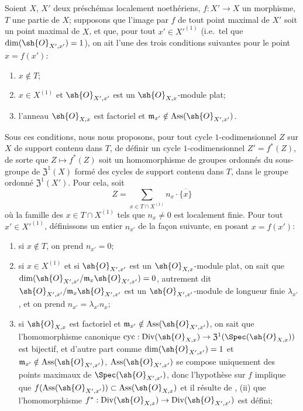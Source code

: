 \begin{env}[21.10.1]
\label{IV.21.10.1}
Soient $X$, $X'$ deux préschémas localement noethériens, $f:X'\to X$ un morphisme, $T$ une partie de $X$;
supposons que l'image par $f$ de tout point maximal de $X'$ soit un point maximal de $X$, et que, pour tout $x'\in X'^{(1)}$ (i.e.\ tel que $\dim(\sh{O}_{X',x'})=1$), on ait l'une des trois conditions suivantes pour le point $x=f(x')$:
\begin{enumerate}[label=(\roman*)]
  \item $x\notin T$;
  \item $x\in X^{(1)}$ et $\sh{O}_{X',x'}$ est un $\sh{O}_{X,x}$-module plat;
  \item l'anneau $\sh{O}_{X,x}$ est factoriel et $\mathfrak{m}_{x'}\notin\operatorname{Ass}(\sh{O}_{X',x'})$.
\end{enumerate}
Sous ces conditions, nous nous proposons, pour tout cycle $1$-codimensionnel $Z$ sur $X$ de support contenu dans $T$, de définir un cycle $1$-codimensionnel $Z'=f^*(Z)$, de sorte que $Z\mapsto f^*(Z)$ soit un homomorphisme de groupes ordonnés du sous-groupe de $\mathfrak{Z}^1(X)$ formé des cycles de support contenu dans $T$, dans le groupe ordonné $\mathfrak{Z}^1(X')$.
Pour cela, soit
\[
\label{IV.21.10.1.1}
  Z=\sum_{x\in T\cap X^{(1)}}n_x\cdot\overline{\{x\}}
  \tag{21.10.1.1}
\]
où la famille des $x\in T\cap X^{(1)}$ tels que $n_x\neq0$ est localement finie.
Pour tout $x'\in X'^{(1)}$, définissons un entier $n_{x'}$ de la façon suivante, en posant $x=f(x')$:
\begin{enumerate}[label=\arabic*\textsuperscript{o}]
  \item si $x\notin T$, on prend $n_{x'}=0$;
  \item si $x\in X^{(1)}$ et si $\sh{O}_{X',x'}$ est un $\sh{O}_{X,x}$-module plat, on sait  que $\dim(\sh{O}_{X',x'}/\mathfrak{m}_x\sh{O}_{X',x'})=0$, autrement dit $\sh{O}_{X',x'}/\mathfrak{m}_x\sh{O}_{X',x'}$ est un $\sh{O}_{X',x'}$-module de longueur finie $\lambda_{x'}$, et on prend $n_{x'}=\lambda_{x'}n_x$;
  \item si $\sh{O}_{X,x}$ est factoriel et $\mathfrak{m}_{x'}\notin\operatorname{Ass}(\sh{O}_{X',x'})$, on sait  que l'homomorphisme canonique $\operatorname{cyc}:\operatorname{Div}(\sh{O}_{X,x})\to\mathfrak{Z}^1(\Spec(\sh{O}_{X,x}))$ est bijectif, et d'autre part comme $\dim(\sh{O}_{X',x'})=1$ et $\mathfrak{m}_{x'}\notin\operatorname{Ass}(\sh{O}_{X',x'})$, $\operatorname{Ass}(\sh{O}_{X',x'})$ se compose uniquement des points maximaux de $\Spec(\sh{O}_{X',x'})$, donc l'hypothèse sur $f$ implique que $f(\operatorname{Ass}(\sh{O}_{X',x'}))\subset\operatorname{Ass}(\sh{O}_{X,x})$ et il résulte de , (ii) que l'homomorphisme $f^*:\operatorname{Div}(\sh{O}_{X,x})\to\operatorname{Div}(\sh{O}_{X',x'})$ est défini;

\end{enumerate}
\end{env}
